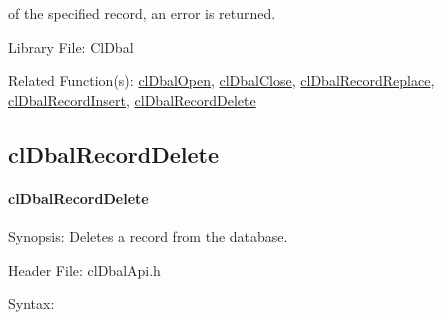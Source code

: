 \begin{flushleft}
\begin{Desc}
of the specified record, an error is returned.\end{Desc}
\begin{Desc}
\item[Library File:]Cl\-Dbal\end{Desc}
\begin{Desc}
\item[Related Function(s):]\hyperlink{pagedbal103}{cl\-Dbal\-Open}, \hyperlink{pagedbal104}{cl\-Dbal\-Close}, 
\hyperlink{pagedbal106}{cl\-Dbal\-Record\-Replace}, \hyperlink{pagedbal105}{cl\-Dbal\-Record\-Insert}, 
\hyperlink{pagedbal108}{cl\-Dbal\-Record\-Delete} \end{Desc}


\newpage

\subsection{clDbalRecordDelete}
\hypertarget{pagedbal108}{}\paragraph{cl\-Dbal\-Record\-Delete}\label{pagedbal108}
\begin{Desc}
\item[Synopsis:]Deletes a record from the database.\end{Desc}
\begin{Desc}
\item[Header File:]clDbalApi.h\end{Desc}
\begin{Desc}
\item[Syntax:]


\end{Desc}
\end{flushleft}
